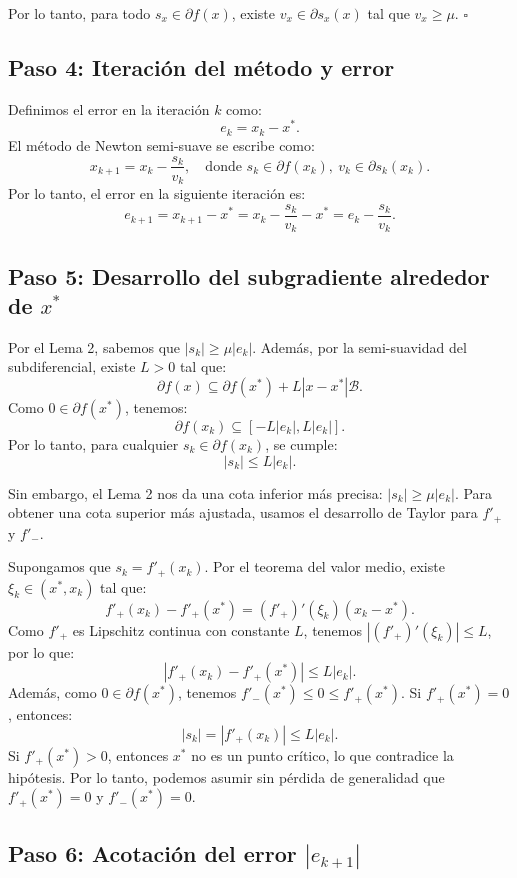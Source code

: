 \documentclass[12pt]{book}
\theoremstyle{definition}
\theoremstyle{plain}
\theoremstyle{remark}
\begin{document}
\medskip
Por lo tanto, para todo \( s_x \in \partial f(x) \), existe \( v_x \in \partial s_x(x) \) tal que \( v_x \geq \mu \). \hfill \(\square\)

\subsection*{Paso 4: Iteración del método y error}

Definimos el error en la iteración \( k \) como:
\[
e_k = x_k - x^*.
\]
El método de Newton semi-suave se escribe como:
\[
x_{k+1} = x_k - \frac{s_k}{v_k}, \quad \text{donde } s_k \in \partial f(x_k), \ v_k \in \partial s_k(x_k).
\]
Por lo tanto, el error en la siguiente iteración es:
\[
e_{k+1} = x_{k+1} - x^* = x_k - \frac{s_k}{v_k} - x^* = e_k - \frac{s_k}{v_k}.
\]

\subsection*{Paso 5: Desarrollo del subgradiente alrededor de \( x^* \)}

Por el Lema 2, sabemos que \( |s_k| \geq \mu |e_k| \). Además, por la semi-suavidad del subdiferencial, existe \( L > 0 \) tal que:
\[
\partial f(x) \subseteq \partial f(x^*) + L |x - x^*| \mathcal{B}.
\]
Como \( 0 \in \partial f(x^*) \), tenemos:
\[
\partial f(x_k) \subseteq [-L |e_k|, L |e_k|].
\]
Por lo tanto, para cualquier \( s_k \in \partial f(x_k) \), se cumple:
\[
|s_k| \leq L |e_k|.
\]

\medskip
Sin embargo, el Lema 2 nos da una cota inferior más precisa: \( |s_k| \geq \mu |e_k| \). Para obtener una cota superior más ajustada, usamos el desarrollo de Taylor para \( f'_+ \) y \( f'_- \).

\medskip
Supongamos que \( s_k = f'_+(x_k) \). Por el teorema del valor medio, existe \( \xi_k \in (x^*, x_k) \) tal que:
\[
f'_+(x_k) - f'_+(x^*) = (f'_+)'(\xi_k) (x_k - x^*).
\]
Como \( f'_+ \) es Lipschitz continua con constante \( L \), tenemos \( |(f'_+)'(\xi_k)| \leq L \), por lo que:
\[
|f'_+(x_k) - f'_+(x^*)| \leq L |e_k|.
\]
Además, como \( 0 \in \partial f(x^*) \), tenemos \( f'_-(x^*) \leq 0 \leq f'_+(x^*) \). Si \( f'_+(x^*) = 0 \), entonces:
\[
|s_k| = |f'_+(x_k)| \leq L |e_k|.
\]
Si \( f'_+(x^*) > 0 \), entonces \( x^* \) no es un punto crítico, lo que contradice la hipótesis. Por lo tanto, podemos asumir sin pérdida de generalidad que \( f'_+(x^*) = 0 \) y \( f'_-(x^*) = 0 \).

\subsection*{Paso 6: Acotación del error \( |e_{k+1}| \)}
\end{document}
